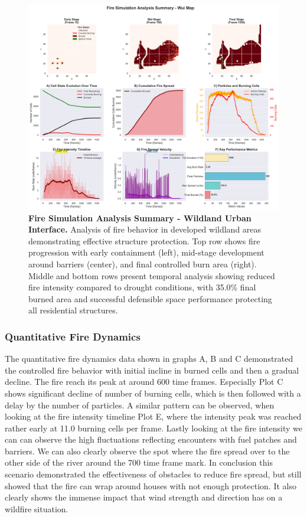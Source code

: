 \begin{figure}[H]
	\centering
	\includegraphics[width=\textwidth]{media/report_summary_wui.png}
	\caption{
		\textbf{Fire Simulation Analysis Summary - Wildland Urban Interface.}
		Analysis of fire behavior in developed wildland areas demonstrating effective structure protection. Top row shows fire progression with early containment (left), mid-stage development around barriers (center), and final controlled burn area (right). Middle and bottom rows present temporal analysis showing reduced fire intensity compared to drought conditions, with 35.0\% final burned area and successful defensible space performance protecting all residential structures.
	}
	\label{fig:res_wui}
\end{figure}
\subsubsection{Quantitative Fire Dynamics}
The quantitative fire dynamics data shown in graphs A, B and C demonstrated the controlled fire behavior with initial incline in burned cells and then a gradual decline. The fire reach its peak at around 600 time frames. Especially Plot C shows significant decline of number of burning cells, which is then followed with a delay by the number of particles. A similar pattern can be observed, when looking at the fire intensity timeline Plot E, where the intensity peak was reached rather early at 11.0 burning cells per frame.\newline
\newline
Lastly looking at the fire intensity we can can observe the high fluctuations reflecting encounters with fuel patches and barriers. We can also clearly observe the spot where the fire spread over to the other side of the river around the 700 time frame mark.\newline
\newline
In conclusion this scenario demonstrated the effectiveness of obstacles to reduce fire spread, but still showed that the fire can wrap around houses with not enough protection. It also clearly shows the immense impact that wind strength and direction has on a wildfire situation.

